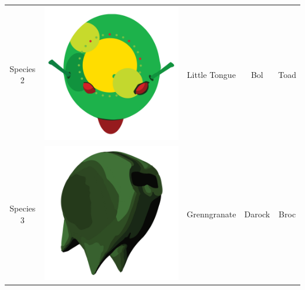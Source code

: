 \begin{table}
\begin{tabular}{ | c | c | c | c | c | }
Species 2  & \includegraphics[valign=m,scale=0.1]{images/species_02.png} & Little Tongue & Bol & Toad \\ 
Species 3  & \includegraphics[valign=m,scale=0.1]{images/species_03.png} & Grenngranate & Darock & Broc \\ 

\end{tabular}
\end{table}
